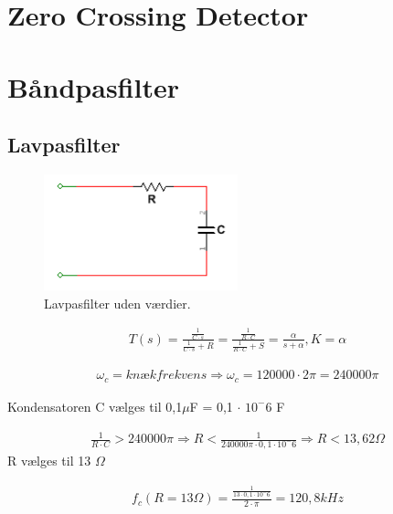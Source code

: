 \newpage

\section{Zero Crossing Detector}

\newpage

\section{Båndpasfilter}

\subsection{Lavpasfilter}

\begin{figure}[htbp]
	\centering
	\includegraphics[width=0.50\textwidth]{billeder/HWdesign/LP_UV.png}
	\caption{Lavpasfilter uden værdier.}
	\label{fig:LP_UV}
\end{figure}


\begin{align}
\label{eq: LP_networkfunction}T(s) = \frac{\frac{1}{C \cdot s}}{\frac{1}{C \cdot s} + R} = \frac{\frac{1}{R \cdot C}}{\frac{1}{R \cdot C}+S}  = \frac{\alpha}{s + \alpha} , K= \alpha
\end{align}

\begin{align}
	\omega_c = knækfrekvens \Rightarrow \omega_c = 120000 \cdot 2 \pi = 240000\pi 
\end{align} 

Kondensatoren C vælges til 0,1$\mu$F  = 0,1 $\cdot$  $10^-6$ F

\begin{align}
	\frac{1}{R \cdot C} > 240000\pi \Rightarrow R < \frac{1}{240000\pi \cdot 0,1 \cdot 10^-6}
	\Rightarrow R < 13,62 \Omega
\end{align}
	R vælges til 13 $\Omega$
	
\begin{align}
	f_c (R=13\Omega) = \frac{\frac{1}{13 \cdot 0,1 \cdot 10^-6}}{2 \cdot \pi} =120,8kHz
\end{align}	
	

